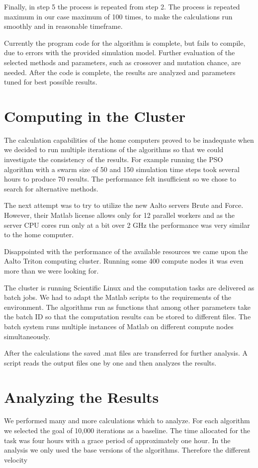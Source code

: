 \documentclass[twoside]{article}
\begin{document}
\begin{multicols}{2}
	Finally, in step 5 the process is repeated from step 2. The process is repeated maximum in our case maximum of 100 times, to make the calculations run smoothly and in reasonable timeframe.
	
	Currently the program code for the algorithm is complete, but fails to compile, due to errors with the provided simulation model. Further evaluation of the selected methods and parameters, such as crossover and mutation chance, are needed. After the code is complete, the results are analyzed and parameters tuned for best possible results.
	
	
	\section{Computing in the Cluster}
	The calculation capabilities of the home computers proved to be inadequate when we decided to run multiple iterations of the algorithms so that we could investigate the consistency of the results. For example running the PSO algorithm with a swarm size of 50 and 150 simulation time steps took several hours to produce 70 results. The performance felt insufficient so we chose to search for alternative methods.
	
	The next attempt was to try to utilize the new Aalto servers Brute and Force. However, their Matlab license allows only for 12 parallel workers and as the server CPU cores run only at a bit over 2 GHz the performance was very similar to the home computer.
	
	Disappointed with the performance of the available resources we came upon the Aalto Triton computing cluster. Running some 400 compute nodes it was even more than we were looking for.
	
	The cluster is running Scientific Linux and the computation tasks are delivered as batch jobs. We had to adapt the Matlab scripts to the requirements of the environment. The algorithms run as functions that among other parameters take the batch ID so that the computation results can be stored to different files. The batch system runs multiple instances of Matlab on different compute nodes simultaneously. 
	
	After the calculations the saved .mat files are transferred for further analysis. A script reads the output files one by one and then analyzes the results.
	
	
	
\section{Analyzing the Results}
We performed many and more calculations which to analyze. For each algorithm we selected the goal of 10,000 iterations as a baseline. The time allocated for the task was four hours with a grace period of approximately one hour. In the analysis we only used the base versions of the algorithms. Therefore the different velocity 


\end{multicols}
\end{document}
